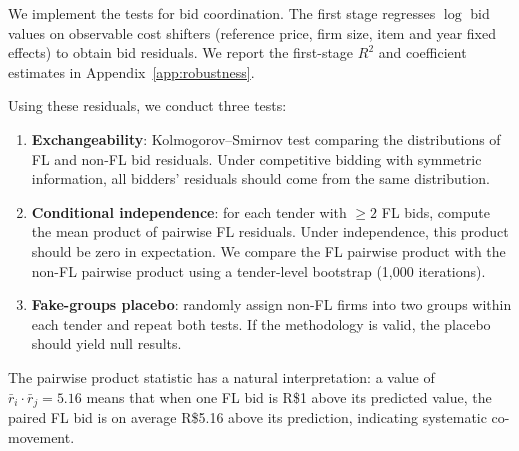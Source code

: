We implement the \citet{bajari2003deciding} tests for bid coordination.
The first stage regresses $\log$ bid values on observable cost shifters
(reference price, firm size, item and year fixed effects) to obtain bid
residuals. We report the first-stage $R^2$ and coefficient estimates in
Appendix~\ref{app:robustness}.

Using these residuals, we conduct three tests:

\begin{enumerate}
  \item \textbf{Exchangeability}: Kolmogorov--Smirnov test comparing the
    distributions of FL and non-FL bid residuals. Under competitive
    bidding with symmetric information, all bidders' residuals should
    come from the same distribution.
  \item \textbf{Conditional independence}: for each tender with $\geq 2$
    FL bids, compute the mean product of pairwise FL residuals. Under
    independence, this product should be zero in expectation. We compare
    the FL pairwise product with the non-FL pairwise product using a
    tender-level bootstrap (1,000 iterations).
  \item \textbf{Fake-groups placebo}: randomly assign non-FL firms into
    two groups within each tender and repeat both tests. If the
    methodology is valid, the placebo should yield null results.
\end{enumerate}

The pairwise product statistic has a natural interpretation: a value of
$\bar{r}_i \cdot \bar{r}_j = 5.16$ means that when one FL bid is R\$1
above its predicted value, the paired FL bid is on average R\$5.16 above
its prediction, indicating systematic co-movement.
